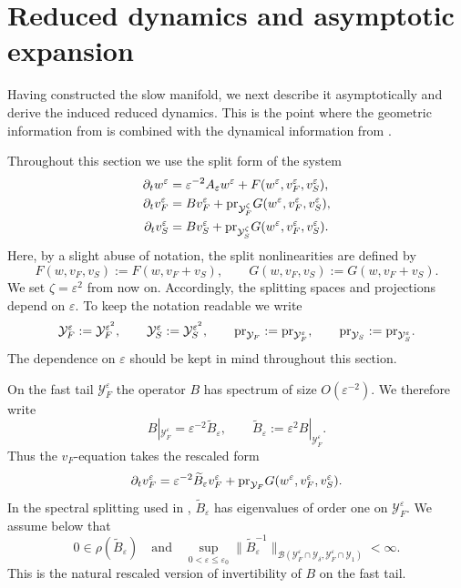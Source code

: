 \documentclass[11pt]{article}
\theoremstyle{definition}
\theoremstyle{remark}
\numberwithin{equation}{section}
\newcommand{\mc}[1]{\mathcal{#1}}
\newcommand{\pr}{\textnormal{pr}}
\begin{document}
\section{Reduced dynamics and asymptotic expansion}\label{sec:reduced}

Having constructed the slow manifold, we next describe it asymptotically and derive the induced reduced dynamics. 
This is the point where the geometric information from  is combined with the dynamical information from .

Throughout this section we use the split form of the system
\[
\begin{aligned}
\partial_t w^\varepsilon
&=
\varepsilon^{-2}A_\varepsilon w^\varepsilon
+
F(w^\varepsilon,v_F^\varepsilon,v_S^\varepsilon),\\
\partial_t v_F^\varepsilon
&=
Bv_F^\varepsilon
+
\pr_{\mc Y_F^\zeta}G(w^\varepsilon,v_F^\varepsilon,v_S^\varepsilon),\\
\partial_t v_S^\varepsilon
&=
Bv_S^\varepsilon
+
\pr_{\mc Y_S^\zeta}G(w^\varepsilon,v_F^\varepsilon,v_S^\varepsilon).
\end{aligned}
\]
Here, by a slight abuse of notation, the split nonlinearities are defined by
\[
F(w,v_F,v_S):=F(w,v_F+v_S),
\qquad
G(w,v_F,v_S):=G(w,v_F+v_S).
\]
We set $\zeta=\varepsilon^2$ from now on. 
Accordingly, the splitting spaces and projections depend on
\(\varepsilon\). To keep the notation readable we write
\[
\mc Y_F^\varepsilon:=\mc Y_F^{\varepsilon^2},
\qquad
\mc Y_S^\varepsilon:=\mc Y_S^{\varepsilon^2},
\qquad
\pr_{\mc Y_F}:=\pr_{\mc Y_F^\varepsilon},
\qquad
\pr_{\mc Y_S}:=\pr_{\mc Y_S^\varepsilon}.
\]
The dependence on \(\varepsilon\) should be kept in mind throughout this
section.

On the fast tail \(\mc Y_F^\varepsilon\) the operator \(B\) has spectrum of
size \(O(\varepsilon^{-2})\). We therefore write
\[
B|_{\mc Y_F^\varepsilon}
=
\varepsilon^{-2}\widetilde B_\varepsilon,
\qquad
\widetilde B_\varepsilon
:=
\varepsilon^2 B|_{\mc Y_F^\varepsilon}.
\]
Thus the \(v_F\)-equation takes the rescaled form
\begin{equation}\label{eq:rescaled-fast-tail}
\partial_t v_F^\varepsilon
=
\varepsilon^{-2}\widetilde B_\varepsilon v_F^\varepsilon
+
\pr_{\mc Y_F}G(w^\varepsilon,v_F^\varepsilon,v_S^\varepsilon).
\end{equation}
In the spectral splitting used in ,
\(\widetilde B_\varepsilon\) has eigenvalues of order one on
\(\mc Y_F^\varepsilon\). We assume below that
\[
0\in \rho(\widetilde B_\varepsilon)
\quad\text{and}\quad
\sup_{0<\varepsilon\le \varepsilon_0}
\|\widetilde B_\varepsilon^{-1}\|_
{\mathcal B(\mc Y_F^\varepsilon\cap\mc Y_\delta,
             \mc Y_F^\varepsilon\cap\mc Y_1)}
<\infty .
\]
This is the natural rescaled version of invertibility of \(B\) on the fast
tail.
\end{document}
